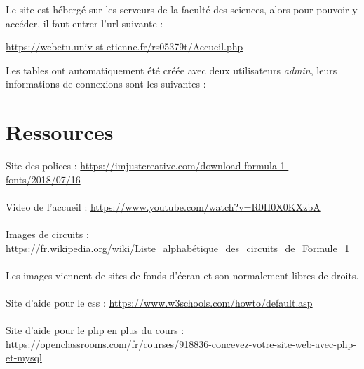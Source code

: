 \documentclass{article}
\begin{document}
Le site est hébergé sur les serveurs de la faculté des sciences, alors pour pouvoir y accéder, il faut entrer l'url suivante :
\begin{center}
\url{https://webetu.univ-st-etienne.fr/rs05379t/Accueil.php}
\end{center}
\vspace{1cm}
Les tables ont automatiquement été créée avec deux utilisateurs \emph{admin}, leurs informations de connexions sont les suivantes :
\vspace{5mm}
\begin{center}
\hspace{1cm}
\end{center}



\newpage
\section{Ressources}

Site des polices : \url{https://imjustcreative.com/download-formula-1-fonts/2018/07/16}\\\\
Video de l'accueil : \url{https://www.youtube.com/watch?v=R0H0X0KXzbA}\\\\
Images de circuits : \url{https://fr.wikipedia.org/wiki/Liste_alphabétique_des_circuits_de_Formule_1}\\\\
Les images viennent de sites de fonds d'écran et son normalement libres de droits.\\\\
Site d'aide pour le css : \url{https://www.w3schools.com/howto/default.asp}\\\\
Site d'aide pour le php en plus du cours :\\
\url{https://openclassrooms.com/fr/courses/918836-concevez-votre-site-web-avec-php-et-mysql}\\\\
\end{document}
